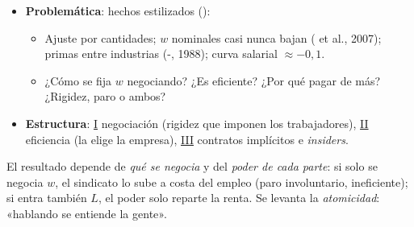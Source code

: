 \documentclass{article}
\begin{document}
\begin{columnas}
\begin{itemize}
\item \textbf{Problemática}: hechos estilizados ():
  \begin{itemize}
  \item Ajuste por cantidades; $w$ nominales casi nunca bajan ( et al., 2007); primas entre industrias (-, 1988); curva salarial $\approx-0{,}1$.
  \item ¿Cómo se fija $w$ negociando? ¿Es eficiente? ¿Por qué pagar de más? ¿Rigidez, paro o ambos?
  \end{itemize}
\item \textbf{Estructura}: \hyperref[rep:I]{I} negociación (rigidez que imponen los trabajadores), \hyperref[rep:II]{II} eficiencia (la elige la empresa), \hyperref[rep:III]{III} contratos implícitos e \emph{insiders}.
\end{itemize}

\begin{ideaclave}
El resultado depende de \emph{qué se negocia} y del \emph{poder de cada parte}: si solo se negocia $w$, el sindicato lo sube a costa del empleo (paro involuntario, ineficiente); si entra también $L$, el poder solo reparte la renta. Se levanta la \emph{atomicidad}: «hablando se entiende la gente».
\end{ideaclave}


\end{columnas}
\end{document}
